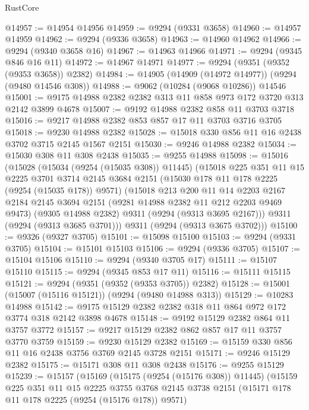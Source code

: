 \begin{lexlean}{RustCore}
\begin{coremodule}
@14957 := @14954 @14956
@14959 := @9294 (@9331 @3658)
@14960 := @14957 @14959
@14962 := @9294 (@9336 @3658)
@14963 := @14960 @14962
@14966 := @9294 (@9340 @3658 @16)
@14967 := @14963 @14966
@14971 := @9294 (@9345 @846 @16 @11)
@14972 := @14967 @14971
@14977 := @9294 (@9351 (@9352 (@9353 @3658)) @2382)
@14984 := @14905 (@14909 (@14972 @14977)) (@9294 (@9480 @14546 @308))
@14988 := @9062 (@10284 (@9068 @10286)) @14546
@15001 := @9175 @14988 @2382 @2382 @313 @11 @858 @973 @172 @3720 @313 @2142 @3899 @4678
@15007 := @9192 @14988 @2382 @858 @11 @3703 @3718
@15016 := @9217 @14988 @2382 @853 @857 @17 @11 @3703 @3716 @3705
@15018 := @9230 @14988 @2382
@15028 := @15018 @330 @856 @11 @16 @2438 @3702 @3715 @2145 @1567 @2151
@15030 := @9246 @14988 @2382
@15034 := @15030 @308 @11 @308 @2438
@15035 := @9255 @14988
@15098 := @15016
    (@15028
      (@15034 (@9254 (@15035 @308)) @11445)
      (@15018
        @225
        @351
        @11
        @15
        @2225
        @3701
        @3714
        @2145
        @3684
        @2151
        (@15030 @178 @11 @178 @2225 (@9254 (@15035 @178)) @9571)
        (@15018
          @213
          @200
          @11
          @14
          @2203
          @2167
          @2184
          @2145
          @3694
          @2151
          (@9281 @14988 @2382 @11 @212 @2203 @9469 @9473)
          (@9305 @14988 @2382)
          @9311
          (@9294 (@9313 @3695 @2167)))
        @9311
        (@9294 (@9313 @3685 @3701)))
      @9311
      (@9294 (@9313 @3675 @3702)))
@15100 := @9326 (@9327 @3705)
@15101 := @15098 @15100
@15103 := @9294 (@9331 @3705)
@15104 := @15101 @15103
@15106 := @9294 (@9336 @3705)
@15107 := @15104 @15106
@15110 := @9294 (@9340 @3705 @17)
@15111 := @15107 @15110
@15115 := @9294 (@9345 @853 @17 @11)
@15116 := @15111 @15115
@15121 := @9294 (@9351 (@9352 (@9353 @3705)) @2382)
@15128 := @15001 (@15007 (@15116 @15121)) (@9294 (@9480 @14988 @313))
@15129 := @10283 @14988
@15142 := @9175 @15129 @2382 @2382 @318 @11 @864 @972 @172 @3774 @318 @2142 @3898 @4678
@15148 := @9192 @15129 @2382 @864 @11 @3757 @3772
@15157 := @9217 @15129 @2382 @862 @857 @17 @11 @3757 @3770 @3759
@15159 := @9230 @15129 @2382
@15169 := @15159 @330 @856 @11 @16 @2438 @3756 @3769 @2145 @3728 @2151
@15171 := @9246 @15129 @2382
@15175 := @15171 @308 @11 @308 @2438
@15176 := @9255 @15129
@15239 := @15157
    (@15169
      (@15175 (@9254 (@15176 @308)) @11445)
      (@15159
        @225
        @351
        @11
        @15
        @2225
        @3755
        @3768
        @2145
        @3738
        @2151
        (@15171 @178 @11 @178 @2225 (@9254 (@15176 @178)) @9571)

\end{coremodule}
\end{lexlean}
